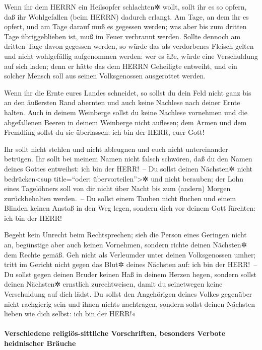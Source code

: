 Wenn ihr dem HERRN ein Heilsopfer schlachten✲ wollt, sollt
ihr es so opfern, daß ihr Wohlgefallen (beim HERRN) dadurch erlangt.
Am Tage, an dem ihr es opfert, und am Tage darauf muß es
gegessen werden; was aber bis zum dritten Tage übriggeblieben ist, muß
im Feuer verbrannt werden. Sollte dennoch am dritten Tage
davon gegessen werden, so würde das als verdorbenes Fleisch gelten und
nicht wohlgefällig aufgenommen werden: wer es äße, würde
eine Verschuldung auf sich laden; denn er hätte das dem HERRN Geheiligte
entweiht, und ein solcher Mensch soll aus seinen Volksgenossen
ausgerottet werden.

Wenn ihr die Ernte eures Landes schneidet, so sollst du
dein Feld nicht ganz bis an den äußersten Rand abernten und auch keine
Nachlese nach deiner Ernte halten. Auch in deinem
Weinberge sollst du keine Nachlese vornehmen und die abgefallenen Beeren
in deinem Weinberge nicht auflesen; dem Armen und dem Fremdling sollst
du sie überlassen: ich bin der HERR, euer Gott!

Ihr sollt nicht stehlen und nicht ableugnen und euch
nicht untereinander betrügen. Ihr sollt bei meinem Namen
nicht falsch schwören, daß du den Namen deines Gottes entweihst: ich bin
der HERR!~-- Du sollst deinen Nächsten✲ nicht
bedrücken\textless sup title=``oder: übervorteilen''\textgreater✲ und
nicht berauben; der Lohn eines Tagelöhners soll von dir nicht über Nacht
bis zum (andern) Morgen zurückbehalten werden.~-- Du
sollst einem Tauben nicht fluchen und einem Blinden keinen Anstoß in den
Weg legen, sondern dich vor deinem Gott fürchten: ich bin der HERR!

Begeht kein Unrecht beim Rechtsprechen; sieh die Person
eines Geringen nicht an, begünstige aber auch keinen Vornehmen, sondern
richte deinen Nächsten✲ dem Rechte gemäß. Geh nicht als
Verleumder unter deinen Volksgenossen umher; tritt im Gericht nicht
gegen das Blut✲ deines Nächsten auf: ich bin der HERR!~--
Du sollst gegen deinen Bruder keinen Haß in deinem Herzen
hegen, sondern sollst deinen Nächsten✲ ernstlich zurechtweisen, damit du
seinetwegen keine Verschuldung auf dich lädst. Du sollst
den Angehörigen deines Volkes gegenüber nicht rachgierig sein und ihnen
nichts nachtragen, sondern sollst deinen Nächsten lieben wie dich
selbst: ich bin der HERR!«

\hypertarget{verschiedene-religiuxf6s-sittliche-vorschriften-besonders-verbote-heidnischer-bruxe4uche}{%
\paragraph{Verschiedene religiös-sittliche Vorschriften, besonders
Verbote heidnischer
Bräuche}\label{verschiedene-religiuxf6s-sittliche-vorschriften-besonders-verbote-heidnischer-bruxe4uche}}

